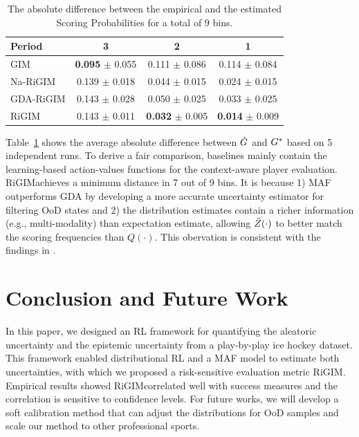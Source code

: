 \documentclass{article}
\newcommand{\sys}{RiGIM}
\newcommand{\goal}{g}
\newcommand{\system}{\sys\;}
\begin{document}
\begin{table}[htbp]
{\begin{tabular}{l|ccc}
Period & 3 & 2 & 1 \\\hline
GIM & {\bf 0.095} $\pm$ 0.055 & 0.111 $\pm$ 0.086 & 0.114 $\pm$ 0.084\\
Na-RiGIM  & 0.139 $\pm$ 0.018 & 0.044 $\pm$ 0.015 & 0.024 $\pm$ 0.015 \\
GDA-RiGIM & 0.143 $\pm$ 0.028 & 0.050 $\pm$ 0.025 & 0.033 $\pm$ 0.025  \\
RiGIM & 0.143 $\pm$ 0.011 & {\bf 0.032} $\pm$ 0.005 & {\bf 0.014} $\pm$ 0.009 \\ \bottomrule
\end{tabular}
}
\vspace{-0.1in}
\caption{The absolute difference between the empirical and the estimated Scoring Probabilities for a total of 9 bins.}
\label{table:calibration-results}
\end{table}

Table~\ref{table:calibration-results} shows the average absolute difference between $\hat{\MakeUppercase{\goal}}$ and $\MakeUppercase{\goal}^{*}$ based on 5 independent runs. To derive a fair comparison, baselines mainly contain the learning-based action-values functions for the context-aware player evaluation. \system achieves a minimum distance in 7 out of 9 bins. It is because 1) MAF outperforms GDA by developing a more accurate uncertainty estimator for filtering OoD states and 2) the distribution estimates contain a richer information (e.g., multi-modality) than expectation estimate, allowing $\Tilde{Z}(\cdot)$ to better match the scoring frequencies than $Q(\cdot)$. This obervation is consistent with the findings in \cite{bellemare2017distributional}.

\section{Conclusion and Future Work}

In this paper, we designed an RL framework for quantifying the aleatoric uncertainty and the epistemic uncertainty from a play-by-play ice hockey dataset. This framework enabled distributional RL and a MAF model to estimate both uncertainties, with which we proposed a risk-sensitive evaluation metric \system. Empirical results showed \system correlated well with success measures and the correlation is sensitive to confidence levels. For future works, we will develop a soft calibration method that can adjust the distributions for OoD samples and scale our method to other professional sports.
\end{document}
